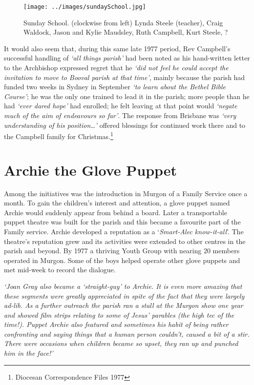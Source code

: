 \begin{figure}[!htb]
\begin{center}
\texttt{[image: ../images/sundaySchool.jpg]}
\caption{Sunday School. (clockwise from left) Lynda Steele (teacher), Craig Waldock, Jason and Kylie Maudsley, Ruth Campbell, Kurt Steele, ?}
\end{center}
\end{figure}




It would also seem that, during this same late 1977 period, Rev Campbell's successful handling of \emph{`all things parish'} had been noted as his hand-written letter to the Archbishop expressed regret that he \emph{`did not feel he could accept the invitation to move to Booval parish at that time'}, mainly because the parish had funded two weeks in Sydney in September \emph{`to learn about the Bethel Bible Course'}; he was the only one trained to lead it in the parish; more people than he had \emph{`ever dared hope'} had enrolled; he felt leaving at that point would \emph{`negate much of the aim of endeavours so far'}. The response from Brisbane was \emph{`very understanding of his position\ldots'} offered blessings for continued work there and to the Campbell family for Christmas.\footnote{Diocesan Correspondence Files 1977}


\section{Archie the Glove Puppet}



Among the initiatives was the introduction in Murgon of a Family Service once a month. To gain the children's interest and attention, a glove puppet named Archie would suddenly appear from behind a board. Later a transportable puppet theatre was built for the parish and this became a favourite part of the Family service. Archie developed a reputation as a `\emph{Smart-Alec know-it-all}'. The theatre's reputation grew and its activities were extended to other centres in the parish and beyond. By 1977 a thriving Youth Group with nearing 20 members operated in Murgon. Some of the boys helped operate other glove puppets and met mid-week to record the dialogue.



\emph{`Joan Gray also became a `straight-guy' to Archie. It is even more amazing that these segments were greatly appreciated in spite of the fact that they were largely ad-lib. As a further outreach the parish ran a stall at the Murgon show one year and showed film strips relating to some of Jesus' parables (the high tec of the time!). Puppet Archie also featured and sometimes his habit of being rather confronting and saying things that a human person couldn't, caused a bit of a stir. There were occasions when children became so upset, they ran up and punched him in the face!'}



